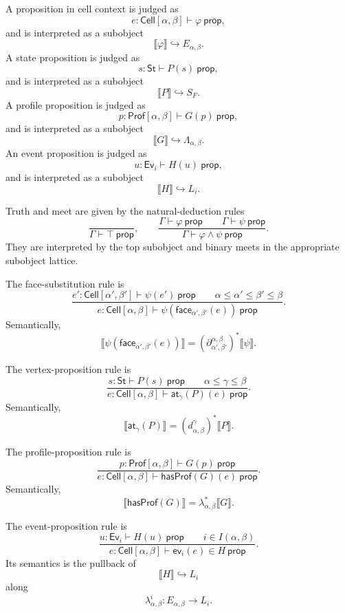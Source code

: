 A proposition in cell context is judged as
\[
    e:\mathsf{Cell}[\alpha,\beta]\vdash\varphi\ \mathsf{prop},
\]
and is interpreted as a subobject
\[
    \llbracket\varphi\rrbracket\hookrightarrow E_{\alpha,\beta}.
\]
A state proposition is judged as
\[
    s:\mathsf{St}\vdash P(s)\ \mathsf{prop},
\]
and is interpreted as a subobject
\[
    \llbracket P\rrbracket\hookrightarrow S_F.
\]
A profile proposition is judged as
\[
    p:\mathsf{Prof}[\alpha,\beta]\vdash G(p)\ \mathsf{prop},
\]
and is interpreted as a subobject
\[
    \llbracket G\rrbracket\hookrightarrow\Lambda_{\alpha,\beta}.
\]
An event proposition is judged as
\[
    u:\mathsf{Ev}_i\vdash H(u)\ \mathsf{prop},
\]
and is interpreted as a subobject
\[
    \llbracket H\rrbracket\hookrightarrow L_i.
\]

Truth and meet are given by the natural-deduction rules
\[
\frac{}{\Gamma\vdash \top\ \mathsf{prop}},
\qquad
\frac{\Gamma\vdash\varphi\ \mathsf{prop}\qquad \Gamma\vdash\psi\ \mathsf{prop}}
     {\Gamma\vdash\varphi\wedge\psi\ \mathsf{prop}}.
\]
They are interpreted by the top subobject and binary meets in the appropriate
subobject lattice.

The face-substitution rule is
\[
\frac{
    e':\mathsf{Cell}[\alpha',\beta']\vdash\psi(e')\ \mathsf{prop}
    \qquad
    \alpha\leq\alpha'\leq\beta'\leq\beta
}{
    e:\mathsf{Cell}[\alpha,\beta]
    \vdash
    \psi(\mathsf{face}_{\alpha',\beta'}(e))\ \mathsf{prop}
}.
\]
Semantically,
\[
        \llbracket
        \psi(\mathsf{face}_{\alpha',\beta'}(e))
        \rrbracket
        =
        (\partial_{\alpha',\beta'}^{\alpha,\beta})^*
        \llbracket\psi\rrbracket.
\]

The vertex-proposition rule is
\[
\frac{
    s:\mathsf{St}\vdash P(s)\ \mathsf{prop}
    \qquad
    \alpha\leq\gamma\leq\beta
}{
    e:\mathsf{Cell}[\alpha,\beta]
    \vdash
    \mathsf{at}_{\gamma}(P)(e)\ \mathsf{prop}
}.
\]
Semantically,
\[
        \llbracket \mathsf{at}_{\gamma}(P)\rrbracket
        =
        (d_{\alpha,\beta}^{\gamma})^*
        \llbracket P\rrbracket.
\]

The profile-proposition rule is
\[
\frac{
    p:\mathsf{Prof}[\alpha,\beta]\vdash G(p)\ \mathsf{prop}
}{
    e:\mathsf{Cell}[\alpha,\beta]
    \vdash
    \mathsf{hasProf}(G)(e)\ \mathsf{prop}
}.
\]
Semantically,
\[
        \llbracket \mathsf{hasProf}(G)\rrbracket
        =
        \lambda_{\alpha,\beta}^*
        \llbracket G\rrbracket.
\]

The event-proposition rule is
\[
\frac{
    u:\mathsf{Ev}_i\vdash H(u)\ \mathsf{prop}
    \qquad
    i\in I(\alpha,\beta)
}{
    e:\mathsf{Cell}[\alpha,\beta]
    \vdash
    \mathsf{ev}_i(e)\in H\ \mathsf{prop}
}.
\]
Its semantics is the pullback of
\[
        \llbracket H\rrbracket\hookrightarrow L_i
\]
along
\[
        \lambda_{\alpha,\beta}^{i}:E_{\alpha,\beta}\to L_i.
\]

